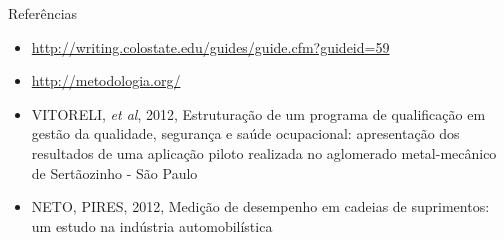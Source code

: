 \documentclass{beamer}
\begin{document}
\begin{frame}{Referências}
  \begin{itemize}
  \item<1-> \url{http://writing.colostate.edu/guides/guide.cfm?guideid=59}
  \item<1-> \url{http://metodologia.org/}
  \item<1-> VITORELI, {\em et al}, 2012, Estruturação de um programa
    de qualificação em gestão da qualidade, segurança e saúde
    ocupacional: apresentação dos resultados de uma aplicação piloto
    realizada no aglomerado metal-mecânico de Sertãozinho - São Paulo
  \item<1-> NETO, PIRES, 2012, Medição de desempenho em cadeias de suprimentos:
um estudo na indústria automobilística
  \end{itemize}
\end{frame}
\end{document}
